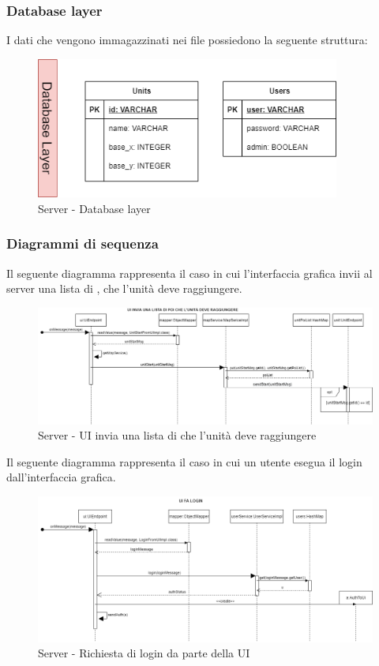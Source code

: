 \subsubsection{Database layer}
I dati che vengono immagazzinati nei file  possiedono la seguente struttura:
\begin{figure}[H]
	\centering
	\includegraphics[width=10cm]{img/server_dblayer.png}
	\caption{Server - Database layer}
\end{figure}

\subsubsection{Diagrammi di sequenza}
Il seguente diagramma rappresenta il caso in cui l'interfaccia grafica invii al server una lista di , che l'unità deve raggiungere.
\begin{figure}[H]
	\centering
	\includegraphics[width=19cm]{img/server_seq1.png}
	\caption{Server - UI invia una lista di  che l'unità deve raggiungere}
\end{figure}

\newpage
Il seguente diagramma rappresenta il caso in cui un utente esegua il login dall'interfaccia grafica.
\begin{figure}[H]
	\centering
	\includegraphics[width=19cm]{img/server_seq2.png}
	\caption{Server - Richiesta di login da parte della UI}
\end{figure}

